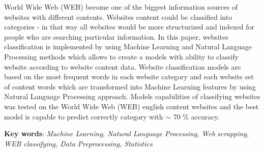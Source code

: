 
World Wide Web (WEB) become one of the biggest information sources of websites with different contents. Websites content could be classified into categories - in that way all websites would be more structurized and indexed for people who are searching particular information. In this paper, websites classification is implemented by using Machine Learning and Natural Language Processing methods which allows to create a models with ability to classify website according to website content data. Website classification models are based on the most frequent words in each website category and each website set of content words which are transformed into Machine Learning features by using Natural Language Processing approach. Models capabilities of classifying websites was tested on the World Wide Web (WEB) english content websites and the best model is capable to predict correctly category with $\sim$ 70 \% accuracy.

\bigskip
\textbf{Key words}: \textit{Machine Learning, Natural Language Processing, Web scrapping, WEB classifying, Data Preprocessing, Statistics}
